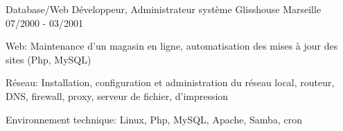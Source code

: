 \begin{cventries}
{    }
  \cventry
    {Database/Web Développeur, Administrateur système}
    {Glisshouse}
    {Marseille}
    {07/2000 - 03/2001}
    {
      \begin{cvitems}
        \item {Web: Maintenance d'un magasin en ligne, automatisation des mises à jour des sites (Php, MySQL)}
        \item {Réseau: Installation, configuration et administration du réseau local, routeur, DNS, firewall, proxy, serveur de fichier, d'impression}
		\item {Environnement technique: Linux, Php, MySQL, Apache, Samba, cron}
      \end{cvitems}
    }
\end{cventries}

